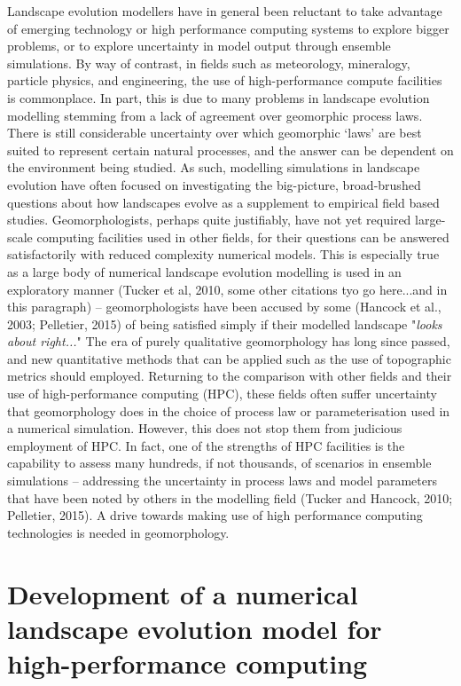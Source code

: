 \documentclass[12pt,oneside,PhD]{muthesis}
\begin{document}
Landscape evolution modellers have in general been reluctant to take advantage of emerging technology or high performance computing systems to explore bigger problems, or to explore uncertainty in model output through ensemble simulations. By way of contrast, in fields such as meteorology, mineralogy, particle physics, and engineering, the use of high-performance compute facilities is commonplace. In part, this is due to many problems in landscape evolution modelling stemming from a lack of agreement over geomorphic process laws. There is still considerable uncertainty over which geomorphic `laws' are best suited to represent certain natural processes, and the answer can be dependent on the environment being studied. As such, modelling simulations in landscape evolution have often focused on investigating the big-picture, broad-brushed questions about how landscapes evolve as a supplement to empirical field based studies. Geomorphologists, perhaps quite justifiably, have not yet required large-scale computing facilities used in other fields, for their questions can be answered satisfactorily with reduced complexity numerical models. This is especially true as a large body of numerical landscape evolution modelling is used in an exploratory manner (Tucker et al, 2010, some other citations tyo go here...and in this paragraph) -- geomorphologists have been accused by some (Hancock et al., 2003; Pelletier, 2015) of being satisfied simply if their modelled landscape "\textit{looks about right...}" The era of purely qualitative geomorphology has long since passed, and new quantitative methods that can be applied such as the use of topographic metrics should employed. Returning to the comparison with other fields and their use of high-performance computing (HPC), these fields often suffer uncertainty that geomorphology does in the choice of process law or parameterisation used in a numerical simulation. However, this does not stop them from judicious employment of HPC. In fact, one of the strengths of HPC facilities is the capability to assess many hundreds, if not thousands, of scenarios in ensemble simulations -- addressing the uncertainty in  process laws and model parameters that have been noted by others in the modelling field (Tucker and Hancock, 2010; Pelletier, 2015).  A drive towards making use of high performance computing technologies is needed in geomorphology.


\chapter{Development of a numerical landscape evolution model for high-performance computing}
\end{document}
